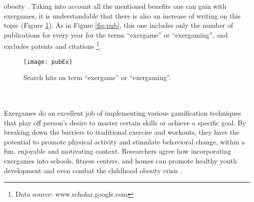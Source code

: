 obesity \cite{taylor2015use, barry2014role, webster2014systematic}.
Taking into account all the mentioned benefits one can gain with exergames, it is understandable that there is also an increase of writing on this topic (Figure \ref{fig:pubEx}). As in Figure \ref{fig:pub}, this one includes only the number of publications for every year for the terms ``exergame'' or ``exergaming'', and excludes patents and citations \footnote{Data source: www.scholar.google.com}. \\
\begin{figure}[h]
    \centering
    \texttt{[image: pubEx]}
    \caption{Search hits on term ``exergame'' or ``exergaming''.}
    \label{fig:pubEx}
\end{figure}\\\\
Exergames do an excellent job of implementing various gamification techniques that play off person's desire to master certain skills or achieve a specific goal. By breaking down the barriers to traditional exercise and workouts, they have the potential to promote physical activity and stimulate behavioral change, within a fun, enjoyable and motivating context. Researchers agree how incorporating exergames into schools, fitness centers, and homes can promote healthy youth development and even combat the childhood obesity crisis \cite{staiano2011exergames}.
